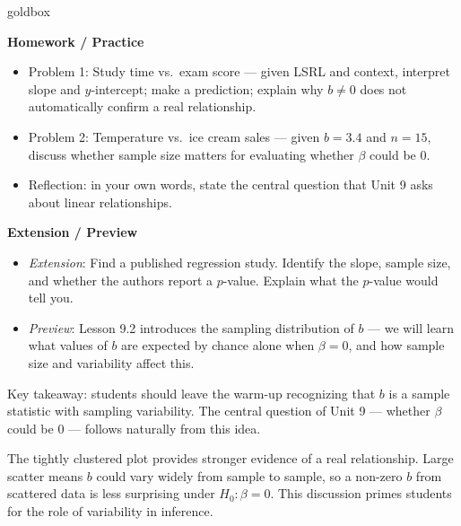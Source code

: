 \documentclass[10pt]{article}
\begin{document}
\begin{skillbox}{goldbox}
\begin{minipage}[t]{0.48\linewidth}
    \textbf{Homework / Practice}
    \begin{itemize}
        \item Problem 1: Study time vs.\ exam score --- given LSRL and context,
              interpret slope and $y$-intercept; make a prediction; explain why
              $b \ne 0$ does not automatically confirm a real relationship.
        \item Problem 2: Temperature vs.\ ice cream sales --- given $b = 3.4$ and
              $n = 15$, discuss whether sample size matters for evaluating
              whether $\beta$ could be 0.
        \item Reflection: in your own words, state the central question that Unit 9
              asks about linear relationships.
    \end{itemize}
\end{minipage}
\hfill
\begin{minipage}[t]{0.48\linewidth}
    \textbf{Extension / Preview}
    \begin{itemize}
        \item \textit{Extension}: Find a published regression study. Identify the
              slope, sample size, and whether the authors report a $p$-value.
              Explain what the $p$-value would tell you.
        \item \textit{Preview}: Lesson 9.2 introduces the sampling distribution of
              $b$ --- we will learn what values of $b$ are expected by chance alone
              when $\beta = 0$, and how sample size and variability affect this.
    \end{itemize}
\end{minipage}
\end{skillbox}


\begin{teachernote}[Warm-Up]
    Key takeaway: students should leave the warm-up recognizing that $b$ is a
    sample statistic with sampling variability. The central question of Unit 9 ---
    whether $\beta$ could be 0 --- follows naturally from this idea.
\end{teachernote}

\begin{teachernote}
    The tightly clustered plot provides stronger evidence of a real relationship.
    Large scatter means $b$ could vary widely from sample to sample, so a non-zero
    $b$ from scattered data is less surprising under $H_0\colon \beta = 0$.
    This discussion primes students for the role of variability in inference.
\end{teachernote}
\end{document}
